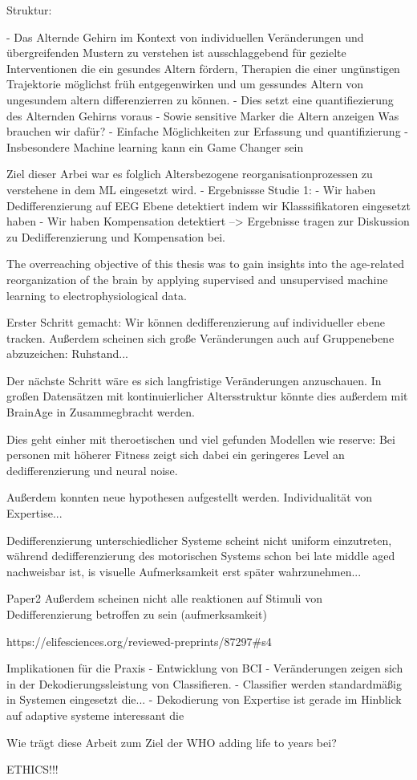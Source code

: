 Struktur: 

- Das Alternde Gehirn im Kontext von individuellen Veränderungen und übergreifenden Mustern zu verstehen ist ausschlaggebend für gezielte Interventionen die ein gesundes Altern fördern, Therapien die einer ungünstigen Trajektorie möglichst früh entgegenwirken und um gessundes Altern von ungesundem altern differenzierren zu können. 
- Dies setzt eine quantifiezierung des Alternden Gehirns voraus 
- Sowie sensitive Marker die Altern anzeigen
Was brauchen wir dafür? 
- Einfache Möglichkeiten zur Erfassung und quantifizierung 
- Insbesondere Machine learning kann ein Game Changer sein 

Ziel dieser Arbei war es folglich Altersbezogene reorganisationprozessen zu verstehene in dem ML eingesetzt wird.  
- Ergebnissse Studie 1:
    - Wir haben Dedifferenzierung auf EEG Ebene detektiert indem wir Klasssifikatoren eingesetzt haben 
    - Wir haben Kompensation detektiert 
    --> Ergebnisse tragen zur Diskussion zu Dedifferenzierung und Kompensation bei. 







The overreaching objective of this thesis was to gain insights into the age-related reorganization of the brain by applying supervised and unsupervised machine learning to electrophysiological data. 

Erster Schritt gemacht: Wir können dedifferenzierung auf individueller ebene tracken. Außerdem scheinen sich große Veränderungen auch auf Gruppenebene abzuzeichen: Ruhstand... 

Der nächste Schritt wäre es sich langfristige Veränderungen anzuschauen. In großen Datensätzen mit kontinuierlicher Altersstruktur könnte dies außerdem mit BrainAge in Zusammegbracht werden.  


Dies geht einher mit theroetischen und viel gefunden Modellen wie reserve: Bei personen mit höherer Fitness zeigt sich dabei ein geringeres Level an dedifferenzierung und neural noise. 

Außerdem konnten neue hypothesen aufgestellt werden. Individualität von Expertise...

Dedifferenzierung unterschiedlicher Systeme scheint nicht uniform einzutreten, während dedifferenzierung des motorischen Systems schon bei late middle aged nachweisbar ist, is visuelle Aufmerksamkeit erst später wahrzunehmen... 

Paper2 
Außerdem scheinen nicht alle reaktionen auf Stimuli von Dedifferenzierung betroffen zu sein (aufmerksamkeit) 

https://elifesciences.org/reviewed-preprints/87297#s4

Implikationen für die Praxis 
- Entwicklung von BCI 
- Veränderungen zeigen sich in der Dekodierungssleistung von Classifieren. 
- Classifier werden standardmäßig in Systemen eingesetzt die...
- Dekodierung von Expertise ist gerade im Hinblick auf adaptive systeme interessant die 

Wie trägt diese Arbeit zum Ziel der WHO adding life to years bei?

ETHICS!!!